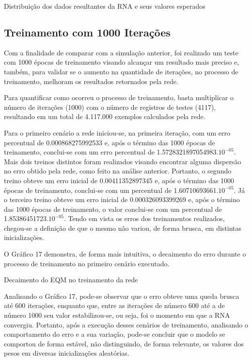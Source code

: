 \begin{grafico}[h]
	\centering
	\caption{Distribuição dos dados resultantes da RNA e seus valores esperados}
	\label{lingua}
\end{grafico}

\subsection{Treinamento com 1000 Iterações}	
Com a finalidade de comparar com a simulação anterior, foi realizado um teste com 1000 épocas de treinamento visando alcançar um resultado mais preciso e, também, para validar se o aumento na quantidade de iterações, no processo de treinamento, melhoram os resultados retornados pela rede.

Para quantificar como ocorreu o processo de treinamento, basta multiplicar o número de iterações (1000) com o número de registros de testes (4117), resultando em um total de 4.117.000 exemplos calculados pela rede.

Para o primeiro cenário a rede iniciou-se, na primeira iteração, com um erro percentual de 0.000868275992533 e, após o término das 1000 épocas de treinamento, conclui-se com um erro percentual de 1.5728321897054983.$10^{-05}$. Mais dois treinos distintos foram realizados visando encontrar alguma dispersão no erro obtido pela rede, como feito na análise anterior. Portanto, o segundo treino obteve um erro inicial de 0.00411352897345 e, após o término das 1000 épocas de treinamento, conclui-se com um percentual de 1.60710693661.$10^{-05}$. Já o terceiro treino obteve um erro inicial de 0.000326093399269 e, após o término das 1000 épocas de treinamento, o valor conclui-se com um percentual de 1.85386451723.$10^{-05}$. Tendo em vista os erros dos treinamentos realizados, chegou-se a definição de que o mesmo não variou, de forma brusca, em distintas inicializações.

O Gráfico 17 demonstra, de forma mais intuitiva, o decaimento do erro durante o processo de treinamento no primeiro cenário executado.

\begin{grafico}[h]
	\centering
	\caption{Decaimento do EQM no treinamento da rede}
	\label{lingua}
\end{grafico}

Analisando o Gráfico 17, pode-se observar que o erro obteve uma queda brusca até 600 iterações, enquanto que, entre as iterações de número 600 até a de número 1000 seu valor estabilizou-se, ou seja, foi o momento em que a RNA convergiu. Portanto, após a execução desses cenários de treinamento, analisando o comportamento do erro e a sua variação, pode-se concluir que o modelo se comportou de forma estável, não distinguindo, de forma relevante, os valores dos pesos em diversas inicializações aleatórias.

